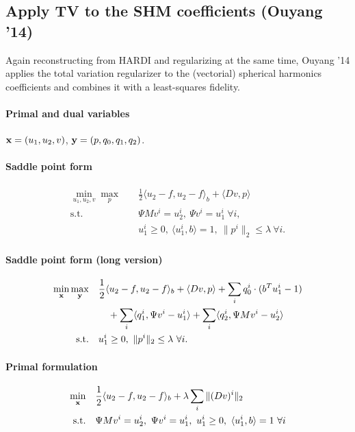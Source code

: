 
\subsection{Apply TV to the SHM coefficients (Ouyang '14)}

Again reconstructing from HARDI and regularizing at the same time, Ouyang '14
applies the total variation regularizer to the (vectorial) spherical harmonics
coefficients and combines it with a least-squares fidelity.

\paragraph{Primal and dual variables}
$\mathbf{x} = (u_1,u_2,v)$, $\mathbf{y} = (p,q_0,q_1,q_2)$.

\paragraph{Saddle point form}
\begin{align*}
    \min_{u_1,u_2,v} \max_{p} \quad
        & \frac{1}{2} \langle u_2 - f, u_2 - f \rangle_b + \langle Dv, p \rangle \\
    \text{s.t.}\quad
        & \Psi M v^i = u_2^i, ~\Psi v^i = u_1^i ~\forall i, \\
        & u_1^i \geq 0, ~\langle u_1^i, b \rangle = 1,
          ~\|p^{i}\|_{2} \leq \lambda ~\forall i.
\end{align*}

\paragraph{Saddle point form (long version)}
\begin{align*}
    \min_{\mathbf{x}} \max_{\mathbf{y}} \quad
        & \frac{1}{2} \langle u_2 - f, u_2 - f \rangle_b
            + \langle Dv, p \rangle
            + \sum_{i} q_0^i \cdot (b^T u_1^i - 1) \\
        &\quad + \sum_{i} \langle q_1^i, \Psi v^i - u_1^i \rangle
            + \sum_{i} \langle q_2^i, \Psi M v^i - u_2^i \rangle \\
    \text{s.t.}\quad
        & u_1^i \geq 0, ~\|p^{i}\|_{2} \leq \lambda ~\forall i.
\end{align*}

\paragraph{Primal formulation}
\begin{align*}
    \min_{\mathbf{x}} \quad
        & \frac{1}{2} \langle u_2 - f, u_2 - f \rangle_b
            + \lambda \sum_{i} \| (D v)^{i} \|_{2} \\
    \text{s.t.}\quad
        & \Psi M v^i = u_2^i, ~\Psi v^i = u_1^i,
          ~u_1^i \geq 0, ~\langle u_1^i, b \rangle = 1 ~\forall i
\end{align*}


